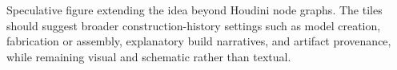 \caption{Speculative figure extending the idea beyond Houdini node graphs. The tiles should suggest broader construction-history settings such as model creation, fabrication or assembly, explanatory build narratives, and artifact provenance, while remaining visual and schematic rather than textual.}
\label{fig:grand-possibilities}
